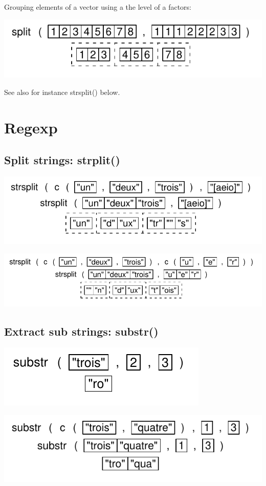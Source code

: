 \documentclass[pdflatex]{article}
\begin{document}
Grouping elements of a vector using a the level of a factors:

\includegraphics{split}

See also for instance strsplit() below.

\section{Regexp}

\subsection{Split strings: strplit()}

\includegraphics{strsplit.pdf}

\includegraphics{strsplit_2.pdf}

\subsection{Extract sub strings: substr()}

\includegraphics{substr.pdf}

\includegraphics{substr_2.pdf}
\end{document}
